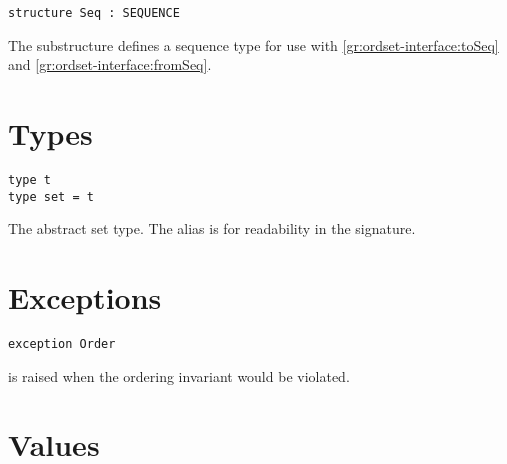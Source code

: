 \begin{cluster}
\label{grp:grm:ordset-interface::sequence}

\begin{gram}
\label{grm:ordset-interface::sequence}
\begin{verbatim}
structure Seq : SEQUENCE
\end{verbatim}
The  substructure defines a sequence type for use with
\ref{gr:ordset-interface:toSeq} and \ref{gr:ordset-interface:fromSeq}.

\end{gram}
\end{cluster}


\section{Types}
\label{sec:ordset-interface::types}

\begin{cluster}
\label{grp:grm:ordset-interface::type}

\begin{gram}
\label{grm:ordset-interface::type}
\begin{verbatim}
type t
type set = t
\end{verbatim}
The abstract set type. The alias  is for readability in the
signature.

\end{gram}
\end{cluster}


\section{Exceptions}
\label{sec:ordset-interface::exceptions}

\begin{cluster}
\label{grp:grm:ordset-interface::exception}

\begin{gram}
\label{grm:ordset-interface::exception}
\begin{verbatim}
exception Order
\end{verbatim}
 is raised when the ordering invariant would be violated.

\end{gram}
\end{cluster}


\section{Values}
\label{sec:ordset-interface::values}

